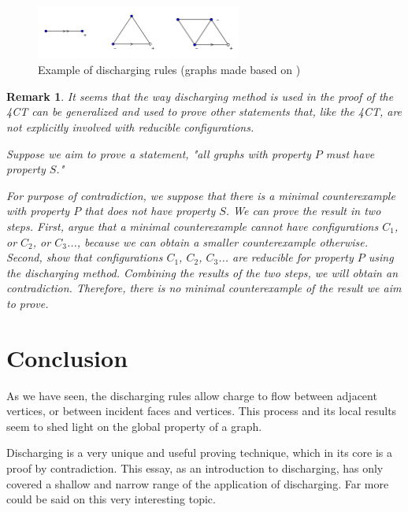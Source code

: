 \documentclass[a4paper, 11pt]{article} %
\newtheorem*{remark}{Remark}
\begin{document}
\begin{figure}
\centering
\includegraphics[width=0.6\textwidth]{pass.jpg}
\caption{Example of discharging rules (graphs made based on \cite{thomas1998update})}
\label{fig:pass}
\end{figure}

\begin{remark}
It seems that the way discharging method is used in the proof of the 4CT can be generalized and used to prove other statements that, like the 4CT, are not explicitly involved with reducible configurations.

Suppose we aim to prove a statement, "all graphs with property $P$ must have property $S$."

For purpose of contradiction, we suppose that there is a minimal counterexample with property $P$ that does not have property $S$. We can prove the result in two steps. First, argue that a minimal counterexample cannot have configurations $C_{1}$, or $ C_{2}$, or $C_{3}$..., because we can obtain a smaller counterexample otherwise. Second, show that configurations $C_{1}$, $ C_{2}$, $C_{3}$... are reducible for property $P$ using the discharging method. Combining the results of the two steps, we will obtain an contradiction. Therefore, there is no minimal counterexample of the result we aim to prove.
\end{remark}


\section{Conclusion}
As we have seen, the discharging rules allow charge to flow between adjacent vertices, or between incident faces and vertices. This process and its local results seem to shed light on the global property of a graph. 

Discharging is a very unique and useful proving technique, which in its core is a proof by contradiction. This essay, as an introduction to discharging, has only covered a shallow and narrow range of the application of discharging. Far more could be said on this very interesting topic.









\end{document}

